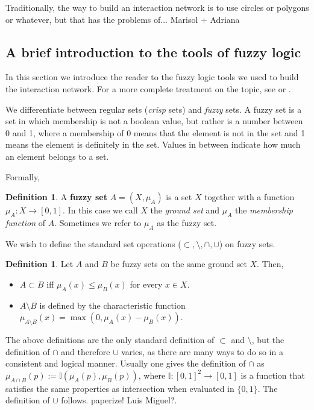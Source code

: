 \documentclass[12pt]{article}
\numberwithin{equation}{section} %
\numberwithin{figure}{section} %
\def\II{{\mathbb{I}}}
\theoremstyle{definition}
\newtheorem{definition}[theorem]{Definition}
\def\tcr#1{\textcolor{MyRed}{#1}}
\begin{document}
Traditionally, the way to build an interaction network is to use circles or polygons or whatever, but that has the problems of... \tcr{Marisol + Adriana}

\subsection{A brief introduction to the tools of fuzzy logic}
In this section we introduce the reader to the fuzzy logic tools we used to build the interaction network. For a more complete treatment on the topic, see \cite{FuzzyLogicSuperBook} or \cite{FuzzyLogicSuperBook2}. 

We differentiate between regular sets (\emph{crisp} sets)  and \emph{fuzzy} sets. A fuzzy set is a set in which membership is not a boolean value, but rather is a number between 0 and 1, where a membership of 0 means that the element is not in the set and 1 means the element is definitely in the set. Values in between indicate how much an element belongs to a set.

Formally,
\begin{definition}
	A \textbf{fuzzy set} $A=(X,\mu_A)$ is a set $X$ together with a function $\mu_A:X \to [0,1]$. In this case we call $X$ the \emph{ground set} and $\mu_A$ the \emph{membership function} of $A$. Sometimes we refer to $\mu_A$ as the fuzzy set.
\end{definition}

We wish to define the standard set operations ($\subset,\setminus,\cap,\cup$) on fuzzy sets. 

\begin{definition}
	Let $A$ and $B$ be fuzzy sets on the same ground set $X$. Then,
	\begin{itemize}
		\item $A \subset B$ iff $\mu_A(x) \leq \mu_B(x)$ for every $x\in X$.
		\item $A\setminus B$ is defined by the characteristic function $\mu_{A\setminus B}(x) = \max(0,\mu_A(x)-\mu_B(x))$.
	\end{itemize}
\end{definition}

The above definitions are the only standard definition of $\subset$ and $\setminus$, but the definition of $\cap$ and therefore $\cup$ varies, as there are many ways to do so in a consistent and logical manner. Usually one gives the definition of $\cap$ as $\mu_{A\cap B}(p) := \II(\mu_A(p),\mu_B(p))$, where  $\II : [0,1]^2 \to [0,1]$ is a function that satisfies the same properties as intersection when evaluated in $\{0,1\}$. The definition of $\cup$ follows. \tcr{paperize! Luis Miguel?}. 
\end{document}
